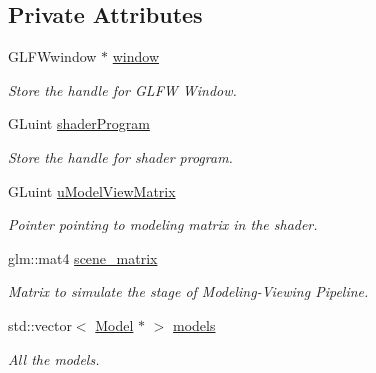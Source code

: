 \subsection*{Private Attributes}
\begin{DoxyCompactItemize}
\item 
G\+L\+F\+Wwindow $\ast$ \hyperlink{classcft_1_1Scene_a5743ac5a5872b962da380e6b8262a347}{window}\hypertarget{classcft_1_1Scene_a5743ac5a5872b962da380e6b8262a347}{}\label{classcft_1_1Scene_a5743ac5a5872b962da380e6b8262a347}

\begin{DoxyCompactList}\small\item\em Store the handle for G\+L\+FW Window. \end{DoxyCompactList}\item 
G\+Luint \hyperlink{classcft_1_1Scene_a33b8e992a20a9a5ed8efc9c9f9959591}{shader\+Program}\hypertarget{classcft_1_1Scene_a33b8e992a20a9a5ed8efc9c9f9959591}{}\label{classcft_1_1Scene_a33b8e992a20a9a5ed8efc9c9f9959591}

\begin{DoxyCompactList}\small\item\em Store the handle for shader program. \end{DoxyCompactList}\item 
G\+Luint \hyperlink{classcft_1_1Scene_a9bac78af74e8c14b1ae9babcf44d1c18}{u\+Model\+View\+Matrix}\hypertarget{classcft_1_1Scene_a9bac78af74e8c14b1ae9babcf44d1c18}{}\label{classcft_1_1Scene_a9bac78af74e8c14b1ae9babcf44d1c18}

\begin{DoxyCompactList}\small\item\em Pointer pointing to modeling matrix in the shader. \end{DoxyCompactList}\item 
glm\+::mat4 \hyperlink{classcft_1_1Scene_a1e1bc4dc1046eb7d799bf24e5ea13e93}{scene\+\_\+matrix}\hypertarget{classcft_1_1Scene_a1e1bc4dc1046eb7d799bf24e5ea13e93}{}\label{classcft_1_1Scene_a1e1bc4dc1046eb7d799bf24e5ea13e93}

\begin{DoxyCompactList}\small\item\em Matrix to simulate the stage of Modeling-\/\+Viewing Pipeline. \end{DoxyCompactList}\item 
std\+::vector$<$ \hyperlink{classcft_1_1Model}{Model} $\ast$ $>$ \hyperlink{classcft_1_1Scene_af28db916199219b8deceb5f1de0a1da7}{models}\hypertarget{classcft_1_1Scene_af28db916199219b8deceb5f1de0a1da7}{}\label{classcft_1_1Scene_af28db916199219b8deceb5f1de0a1da7}

\begin{DoxyCompactList}\small\item\em All the models. \end{DoxyCompactList}\end{DoxyCompactItemize}
